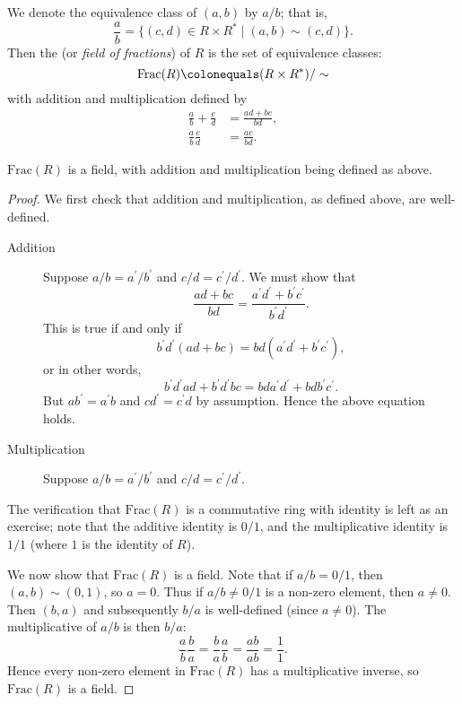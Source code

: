 We denote the equivalence class of $(a,b)$ by $a/b$; that is,
\[\frac{a}{b}=\{(c,d)\in R\times R^*\mid(a,b)\sim(c,d)\}.\]
Then the  (or \emph{field of fractions}) of $R$ is the set of equivalence classes:
\[\mathrm{Frac}(R)\colonequals(R\times R^*)/\sim\]
with addition and multiplication defined by
\begin{align*}
\frac{a}{b}+\frac{c}{d}&=\frac{ad+bc}{bd},\\
\frac{a}{b}\frac{c}{d}&=\frac{ac}{bd}.
\end{align*}

\begin{lemma}
$\mathrm{Frac}(R)$ is a field, with addition and multiplication being defined as above.
\end{lemma}

\begin{proof}
We first check that addition and multiplication, as defined above, are well-defined.
\begin{description}
\item[Addition] Suppose $a/b=a^\prime/b^\prime$ and $c/d=c^\prime/d^\prime$. We must show that
\[\frac{ad+bc}{bd}=\frac{a^\prime d^\prime+b^\prime c^\prime}{b^\prime d^\prime}.\]
This is true if and only if
\[b^\prime d^\prime(ad+bc)=bd(a^\prime d^\prime+b^\prime c^\prime),\]
or in other words,
\[b^\prime d^\prime ad+b^\prime d^\prime bc=bda^\prime d^\prime+bdb^\prime c^\prime.\]
But $ab^\prime=a^\prime b$ and $cd^\prime=c^\prime d$ by assumption. Hence the above equation holds.

\item[Multiplication] Suppose $a/b=a^\prime/b^\prime$ and $c/d=c^\prime/d^\prime$.
\end{description}

The verification that $\mathrm{Frac}(R)$ is a commutative ring with identity is left as an exercise; note that the additive identity is $0/1$, and the multiplicative identity is $1/1$ (where $1$ is the identity of $R$).

We now show that $\mathrm{Frac}(R)$ is a field.
Note that if $a/b=0/1$, then $(a,b)\sim(0,1)$, so $a=0$.
Thus if $a/b\neq0/1$ is a non-zero element, then $a\neq0$. 
Then $(b,a)$ and subsequently $b/a$ is well-defined (since $a\neq 0$).
The multiplicative of $a/b$ is then $b/a$:
\[\frac{a}{b}\frac{b}{a}=\frac{b}{a}\frac{a}{b}=\frac{ab}{ab}=\frac{1}{1}.\]
Hence every non-zero element in $\mathrm{Frac}(R)$ has a multiplicative inverse, so $\mathrm{Frac}(R)$ is a field.
\end{proof}

